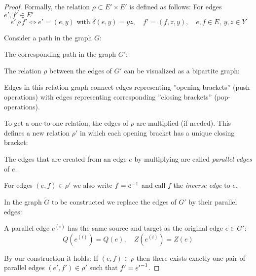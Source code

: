 \begin{proof}
Formally, the relation $\rho \subset E' \times E'$ is defined as follows: For
edges $e', f' \in E'$
\[ e' \,\rho\, f' \iff e' = (e, y)\text{ with }\delta(e, y) = y z,\quad f' = (f,
z, y),\quad e, f \in E,\ y,z \in Y \]

Consider a path in the graph $G$:

\begin{center}

\end{center}

The corresponding path in the graph $G'$:

\begin{center}

\end{center}

The relation $\rho$ between the edges of $G'$ can be visualized as a bipartite
graph:

\begin{center}

\end{center}

Edges in this relation graph connect edges representing ''opening
brackets'' (push-operations) with edges representing corresponding ''closing
brackets'' (pop-operations).

To get a one-to-one relation, the edges of $\rho$ are multiplied (if
needed). This defines a new relation $\rho'$ in which each opening bracket
has a unique closing bracket:

\begin{center}

\end{center}

The edges that are created from an edge $e$ by multiplying are called {\em
parallel edges} of $e$.

For edges $(e, f) \in \rho'$ we also write $f = \mbox{${e}^{-1}$}$ and call $f$
the {\em inverse edge} to $e$.

In the graph $\tilde{G}$ to be constructed we replace the edges of $G'$ by their
parallel edges:

\begin{center}

\end{center}

A parallel edge $e^{(i)}$ has the same source and target as the original
edge $e \in G'$:
\[ Q(e^{(i)}) = Q(e),\quad Z(e^{(i)}) = Z(e) \]

By our construction it holds:
If $(e, f) \in \rho$ then there exists exactly one pair of parallel edges
$(e', f')  \in \rho'$ such that $f' = \mbox{${e'}^{-1}$}$.


\end{proof}

